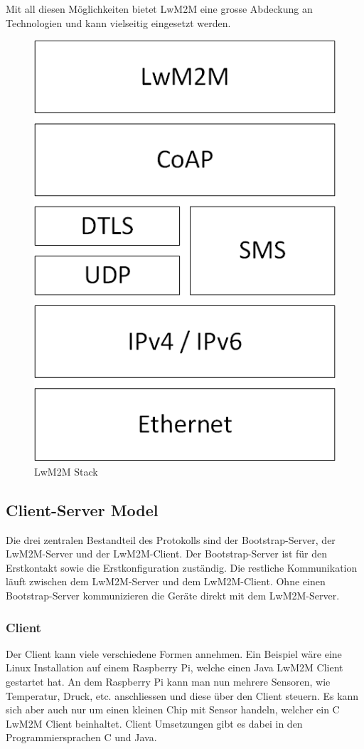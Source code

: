Mit all diesen Möglichkeiten bietet LwM2M eine grosse Abdeckung an Technologien und kann vielseitig eingesetzt werden. 
\begin{figure}[H]
\includegraphics[scale=0.3]{../02_Analyse/images/lwm2m/stack.png}
\caption{LwM2M Stack}
\end{figure}

\newpage

\subsection{Client-Server Model}
Die drei zentralen Bestandteil des Protokolls sind der Bootstrap-Server, der LwM2M-Server und der LwM2M-Client. Der Bootstrap-Server ist für den Erstkontakt sowie die Erstkonfiguration zuständig. Die restliche Kommunikation läuft zwischen dem LwM2M-Server und dem LwM2M-Client. Ohne einen Bootstrap-Server kommunizieren die Geräte direkt mit dem LwM2M-Server.
\subsubsection{Client}
Der Client kann viele verschiedene Formen annehmen. Ein Beispiel wäre eine Linux Installation auf einem Raspberry Pi, welche einen Java LwM2M Client gestartet hat. An dem Raspberry Pi kann man nun mehrere Sensoren, wie Temperatur, Druck, etc. anschliessen und diese über den Client steuern. Es kann sich aber auch nur um einen kleinen Chip mit Sensor handeln, welcher ein C LwM2M Client beinhaltet. Client Umsetzungen gibt es dabei in den Programmiersprachen C und Java.
